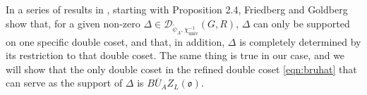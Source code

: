 \documentclass[11pt,letterpaper]{article}
\newcommand{\calD}{\mathcal{D}}
\newcommand{\goth}{\mathfrak}
\newtheorem{Lemma}[Theorem]{Lemma}
\theoremstyle{remark}
\numberwithin{equation}{section}
\begin{document}
In a series of results in \cite{FG}, starting with Proposition 2.4, Friedberg and Goldberg show that, for a given non-zero $\Delta \in \calD_{\widetilde{\psi}_A,\chi_{\text{univ}}^{-1}}(G,R)$, $\Delta$ can only be supported on one specific double coset, and that, in addition, $\Delta$ is completely determined by its restriction to that double coset. The same thing is true in our case, and we will show that the only double coset in the refined double coset \eqref{eqn:bruhat} that can serve as the support of $\Delta$ is $B\overline{U}_AZ_L(\goth{o})$. 


\begin{comment}
\begin{Lemma}\label{lemma:cosets}
If $w(\alpha) \in \Phi^+$ for any $\alpha$ such that $x_{\alpha}(t)$ is in the support of $\tilde{\psi}_A$, then every element of $\calD_{\widetilde{\psi}_A,\chi_{\text{univ}}^{-1}}(G,R)$ must vanish on $Bwu_{-\alpha_1}\overline{U}_AZ_L(\goth{o})$, where $u_{-\alpha_1} \in x_{-\alpha_1}(F)$.
\end{Lemma}
\begin{proof}
In this case, we have $\chi_{\text{univ}}^{-1}(x_{w(\alpha)}(t)) = 1$ for all $t \in F$, so in order for \eqref{compatibility} to hold, we would need $\widetilde{\psi}_A
\end{proof}
\end{comment}
\end{document}
